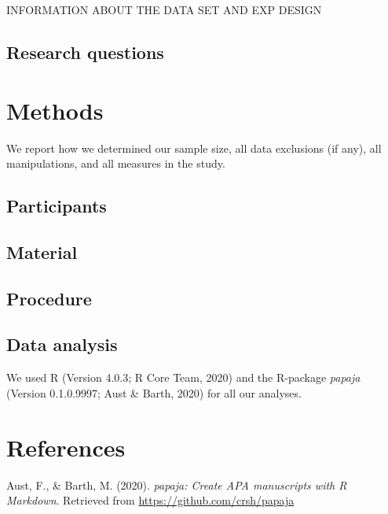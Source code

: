 \documentclass[
  english,
  man]{apa6}
\begin{document}
INFORMATION ABOUT THE DATA SET AND EXP DESIGN

\hypertarget{research-questions}{%
\subsection{Research questions}\label{research-questions}}

\hypertarget{methods}{%
\section{Methods}\label{methods}}

We report how we determined our sample size, all data exclusions (if any), all manipulations, and all measures in the study.

\hypertarget{participants}{%
\subsection{Participants}\label{participants}}

\hypertarget{material}{%
\subsection{Material}\label{material}}

\hypertarget{procedure}{%
\subsection{Procedure}\label{procedure}}

\hypertarget{data-analysis}{%
\subsection{Data analysis}\label{data-analysis}}

We used R (Version 4.0.3; R Core Team, 2020) and the R-package \emph{papaja} (Version 0.1.0.9997; Aust \& Barth, 2020) for all our analyses.

\newpage

\hypertarget{references}{%
\section{References}\label{references}}

\begingroup
\setlength{\parindent}{-0.5in}
\setlength{\leftskip}{0.5in}

\hypertarget{refs}{}
\leavevmode\hypertarget{ref-R-papaja}{}%
Aust, F., \& Barth, M. (2020). \emph{papaja: Create APA manuscripts with R Markdown}. Retrieved from \url{https://github.com/crsh/papaja}
\end{document}
